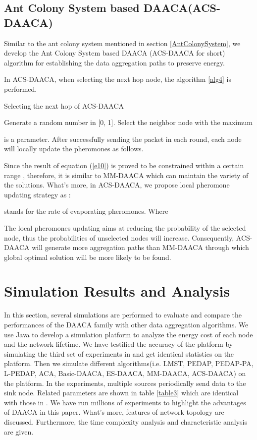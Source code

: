 \documentclass{elsarticle}
\begin{document}
\subsection{Ant Colony System based DAACA(ACS-DAACA)} \label{ACSDAACA}
Similar to the ant colony system mentioned in section \ref{AntColonySystem}, we develop the Ant Colony System based DAACA (ACS-DAACA for short) algorithm for establishing the data aggregation paths to preserve energy.

In ACS-DAACA, when selecting the next hop node, the algorithm \ref{alg4} is performed.
\begin{algorithm}
\caption{Selecting the next hop of ACS-DAACA} \label{alg4}
\begin{algorithmic}[1]
\STATE Generate a random number  in [0, 1].
\IF { }
\STATE Select the neighbor node with the maximum 
\ELSE
{}
\ENDIF
\end{algorithmic}
\end{algorithm}
 is a parameter. After successfully sending the packet in each round, each node will locally update the pheromones as follows.

Since the result of equation (\ref{e10}) is proved to be constrained within a certain range \cite{label-31}, therefore, it is similar to MM-DAACA which can maintain the variety of the solutions. What's more, in ACS-DAACA, we propose local pheromone updating strategy as :

 stands for the rate of evaporating pheromones.
Where


The local pheromones updating aims at reducing the probability of the selected node, thus the probabilities of unselected nodes will increase. Consequently, ACS-DAACA will generate more aggregation paths than MM-DAACA through which global optimal solution will be more likely to be found.


\section{Simulation Results and Analysis} \label{simulationResultsandAnalysis}
In this section, several simulations are performed to evaluate and compare the performances of the DAACA family with other data aggregation algorithms. We use Java to develop a simulation platform to analyze the energy cost of each node and the network lifetime. We have testified the accuracy of the platform by simulating the third set of experiments in \cite{label-10} and get identical statistics on the platform. Then we simulate different algorithms(i.e. LMST, PEDAP, PEDAP-PA, L-PEDAP, ACA, Basic-DAACA, ES-DAACA, MM-DAACA, ACS-DAACA) on the platform. In the experiments, multiple sources periodically send data to the sink node. Related parameters are shown in table \ref{table3} which are identical with those in \cite{label-10}. We have run millions of experiments to highlight the advantages of DAACA in this paper. What's more, features of network topology are discussed. Furthermore, the time complexity analysis and characteristic analysis are given.
\end{document}
